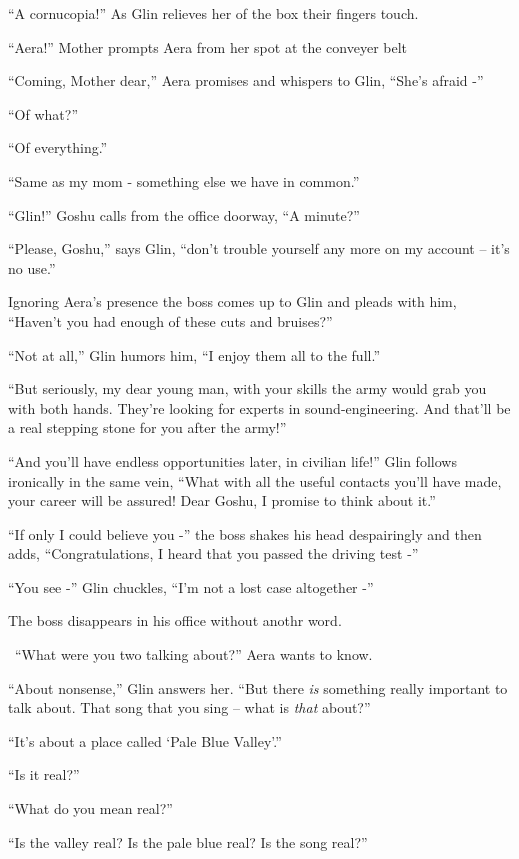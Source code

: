 \documentclass[twoside,11pt]{book}
\begin{document}
``A cornucopia!'' As Glin relieves her of the box their fingers touch.

``Aera!'' Mother prompts Aera from her spot at the conveyer belt

``Coming, Mother dear,'' Aera promises and whispers to Glin, ``She's afraid
-''

``Of what?''

``Of everything.''

``Same as my mom - something else we have in common.''

``Glin!'' Goshu calls from the office doorway, ``A minute?''

``Please, Goshu,'' says Glin, ``don't trouble yourself any more on my account --
it's no use.''

Ignoring Aera's presence the boss comes up to Glin and pleads with him, ``Haven't you had enough of these
cuts and bruises?''

``Not at all,'' Glin humors him, ``I enjoy them all to the full.''

``But seriously, my dear young man, with your skills the army would grab you with both hands. They're
looking for experts in sound-engineering. And that'll be a real stepping stone for you after the army!''

``And you'll have endless opportunities later, in civilian life!'' Glin follows
ironically in the same vein, ``What with all the useful contacts you'll have made, your
career will be assured!  Dear Goshu, I promise to think about it.''

``If only I could believe you -'' the boss shakes his head despairingly and
then adds, ``Congratulations, I heard that you passed the driving test -''

``You see -'' Glin chuckles, ``I'm not a lost case altogether
-''

The boss disappears in his office without anothr word.

\ ``What were you two talking about?'' Aera wants to know.

``About nonsense,'' Glin answers her. ``But there \textit{is} something really
important to talk about. That song that you sing -- what is \textit{that} about?''

``It's about a place called `Pale Blue Valley'.''

``Is it real?''

``What do you mean real?''

``Is the valley real? Is the pale blue real? Is the song real?''
\end{document}
